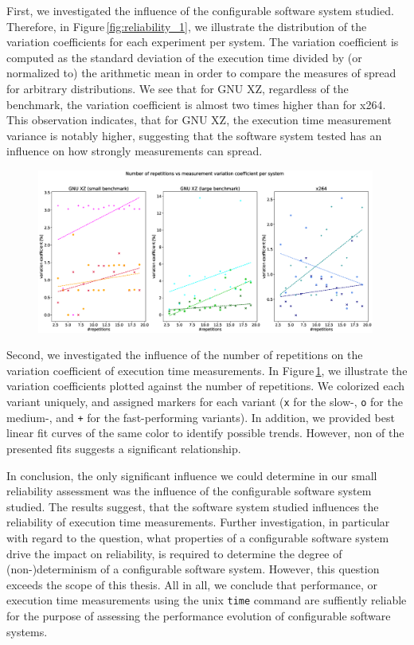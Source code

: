 First, we investigated the influence of the configurable software system
studied. Therefore, in Figure\,\ref{fig:reliability_1}, we illustrate the
distribution of the variation coefficients for each experiment per system. The variation
coefficient is computed as the  standard deviation of the execution time divided
by (or normalized to) the arithmetic mean in order to compare the measures of
spread for arbitrary distributions. 
We see that for GNU XZ, regardless of the benchmark, the variation coefficient
is almost two times higher than for x264. This observation indicates, that for
GNU XZ, the execution time measurement variance is notably higher, suggesting
that the software system tested has an influence on how strongly measurements
can spread.

\begin{figure}
\centering
\includegraphics[width=0.99\textwidth]{images/reliability_3.eps}
\caption{}\label{fig:reliability_3}
\end{figure}

Second, we investigated the influence of the number of repetitions on the
variation coefficient of execution time measurements. In
Figure\,\ref{fig:reliability_3}, we illustrate the variation coefficients
plotted against the number of repetitions. We colorized each variant uniquely,
and assigned markers for each variant (\texttt{x} for the slow-, \texttt{o} for
the medium-, and \texttt{+} for the fast-performing variants). In addition, we
provided best linear fit curves of the same color to identify possible
trends. However, non of the presented fits suggests a significant relationship.

In conclusion, the only significant influence we could determine in our small
reliability assessment was the influence of the configurable software system
studied. The results suggest, that the software system studied influences the
reliability of execution time measurements. Further investigation, in particular
with regard to the question, what properties of a configurable software system
drive the impact on reliability, is required to determine the degree of
(non-)determinism of a configurable software system. However, this question
exceeds the scope of this thesis. All in all, we conclude that performance, or
execution time measurements using the unix \texttt{time} command are suffiently
reliable for the purpose of assessing the performance evolution of configurable
software systems.



